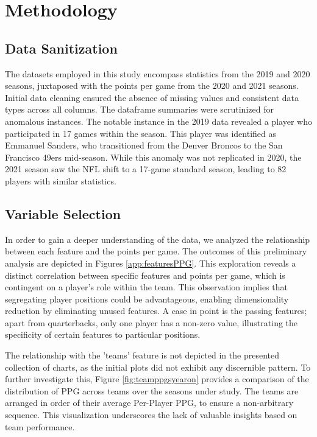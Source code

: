 \chapter{Methodology}
\label{ch:methodology}
\glsresetall

\section{Data Sanitization}

The datasets employed in this study encompass statistics from the 2019 and 2020 seasons, 
juxtaposed with the points per game from the 2020 and 2021 seasons. 
Initial data cleaning ensured the absence of missing values and consistent data types across all columns. 
The dataframe summaries were scrutinized for anomalous instances. 
The notable instance in the 2019 data revealed a player who participated in 17 games within the season. This player was identified as Emmanuel Sanders, who transitioned from the Denver Broncos to the San Francisco 49ers mid-season. While this anomaly was not replicated in 2020, the 2021 season saw the NFL shift to a 17-game standard season, leading to 82 players with similar statistics.

\section{Variable Selection}

In order to gain a deeper understanding of the data, we analyzed the relationship between each feature and the points per game. 
The outcomes of this preliminary analysis are depicted in Figures \ref{app:featuresPPG}. 
This exploration reveals a distinct correlation between specific features and points per game, 
which is contingent on a player's role within the team. 
This observation implies that segregating player positions could be advantageous, 
enabling dimensionality reduction by eliminating unused features. 
A case in point is the passing features; apart from quarterbacks, only one player has a non-zero value, 
illustrating the specificity of certain features to particular positions.

The relationship with the 'teams' feature is not depicted in the presented collection of charts, 
as the initial plots did not exhibit any discernible pattern.
To further investigate this, Figure \ref{fig:teamppgsyearon} provides a comparison of the 
distribution of PPG across teams over the seasons under study.
The teams are arranged in order of their average Per-Player PPG, to ensure a non-arbitrary sequence.
This visualization underscores the lack of valuable insights based on team performance.

